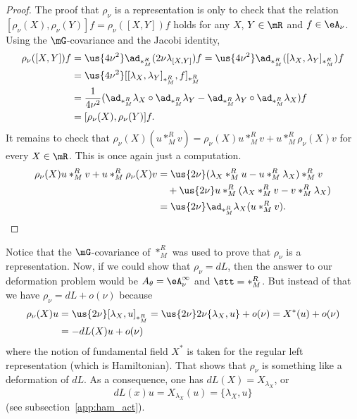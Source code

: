 \begin{proof}
The proof  that $\rho_{\nu}$ is a representation is only to check that the relation $[\rho_{\nu}(X),\rho_{\nu}(Y)]f=\rho_{\nu}([X,Y])f$ holds for any $X$, $Y\in\mR$ and $f\in\eA_{\nu}$. Using the $\mG$-covariance and the Jacobi identity,
\begin{equation}
\begin{split}
  \rho_{\nu}([X,Y])f&=\us{4\nu^2}\ad_{\ast_M^R}(2\nu\lambda_{[X,Y]})f
            =\us{4\nu^2}\ad_{\ast_M^R}([\lambda_X,\lambda_Y]_{\ast_M^R})f\\
        &=\us{4\nu^2}[[\lambda_X,\lambda_Y]_{\ast_M^R},f]_{\ast_M^R}\\
            &=\frac{1}{ 4\nu^2 }(\ad_{\ast_M^R}\lambda_X\circ\ad_{\ast_M^R}\lambda_Y-\ad_{\ast_M^R}\lambda_Y\circ\ad_{\ast_M^R}\lambda_X)f\\
        &=[\rho_{\nu}(X),\rho_{\nu}(Y)]f.
\end{split}
\end{equation}
It remains to check that $\rho_{\nu}(X)(u\ast_M^R v)=\rho_{\nu}(X)u\ast_M^R v+u\ast_M^R\rho_{\nu}(X)v$ for every $X\in\mR$. This is once again just a computation.
\begin{equation}
\begin{split}
   \rho_{\nu}(X)u\ast_M^R v+u\ast_M^R\rho_{\nu}(X)v&=\us{2\nu}(\lambda_X\ast_M^R u-u\ast_M^R\lambda_X)\ast_M^R v\\
                           &\quad+\us{2\nu}u\ast_M^R(\lambda_X\ast_M^R v-v\ast_M^R\lambda_X)\\
                           &=\us{2\nu}\ad_{\ast_M^R}\lambda_X(u\ast_M^R v).
\end{split}
\end{equation}
\end{proof}
Notice that the $\mG$-covariance of $\ast_M^R$ was used to prove that $\rho_{\nu}$ is a representation.  Now, if we could show that $\rho_{\nu}=dL$, then the answer to our deformation problem would be $A_{\theta}=\eA^{\infty}_{\nu}$ and $\stt=\ast_M^R$. But instead of that we have $\rho_{\nu}=dL+o(\nu)$ because
\begin{equation}
\begin{split}
  \rho_{\nu}(X)u&=\us{2\nu}[\lambda_X,u]_{\ast_M^R}
         =\us{2\nu} 2\nu\{\lambda_X,u\}+o(\nu)
     =X^*(u)+o(\nu)\\
    &=-dL(X)u+o(\nu)
\end{split}
\end{equation}
where the notion of fundamental field $X^*$ is taken for the regular left representation (which is Hamiltonian). That shows that $\rho_{\nu}$ is something like a deformation of $dL$. As a consequence, one has $dL(X)=X_{\lambda_X}$, or
 \begin{equation}\label{eq:dL_et_Poisson}
 dL(x)u=X_{\lambda_X}(u)=\{\lambda_X,u\}
 \end{equation}
(see subsection~\ref{app:ham_act}).

